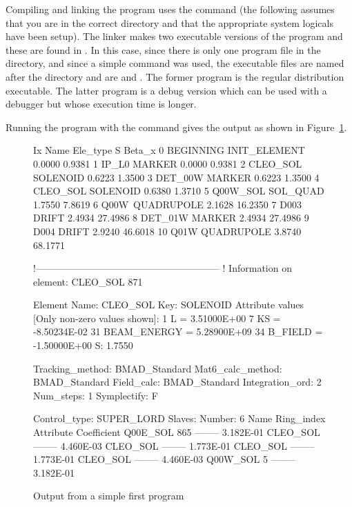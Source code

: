 Compiling and linking the program uses the  command (the
following assumes that you are in the correct directory and that the
appropriate system logicals have been setup). The linker makes two
executable versions of the program and these are found in .
In this case, since there is only one program file in the directory, and
since a simple  command was used, the executable files are
named after the directory and are  and
. The former program is the regular 
distribution executable. The latter program is a debug version
which can be used with a debugger but whose execution time is longer.

Running the program with the command 
gives the output as shown in Figure~\ref{f:output}.

\begin{figure}
\begin{listing}{1}
  Ix  Name              Ele_type                   S      Beta_x
   0  BEGINNING         INIT_ELEMENT          0.0000      0.9381
   1  IP_L0             MARKER                0.0000      0.9381
   2  CLEO_SOL\3        SOLENOID              0.6223      1.3500
   3  DET_00W           MARKER                0.6223      1.3500
   4  CLEO_SOL\4        SOLENOID              0.6380      1.3710
   5  Q00W\CLEO_SOL     SOL_QUAD              1.7550      7.8619
   6  Q00W\             QUADRUPOLE            2.1628     16.2350
   7  D003              DRIFT                 2.4934     27.4986
   8  DET_01W           MARKER                2.4934     27.4986
   9  D004              DRIFT                 2.9240     46.6018
  10  Q01W              QUADRUPOLE            3.8740     68.1771

 !---------------------------------------------------------
 ! Information on element: CLEO_SOL 871

  Element Name: CLEO_SOL
  Key: SOLENOID
  Attribute values [Only non-zero values shown]:
      1   L                =  3.51000E+00
      7   KS               = -8.50234E-02
     31   BEAM_ENERGY      =  5.28900E+09
     34   B_FIELD          = -1.50000E+00
  S:       1.7550

  Tracking_method:  BMAD_Standard
  Mat6_calc_method: BMAD_Standard
  Field_calc:       BMAD_Standard
  Integration_ord:    2
  Num_steps:          1
  Symplectify:        F

  Control_type: SUPER_LORD
  Slaves: Number:   6
      Name            Ring_index  Attribute       Coefficient
      Q00E\CLEO_SOL          865  --------          3.182E-01
      CLEO_SOL  --------          4.460E-03
      CLEO_SOL  --------          1.773E-01
      CLEO_SOL  --------          1.773E-01
      CLEO_SOL  --------          4.460E-03
      Q00W\CLEO_SOL            5  --------          3.182E-01
\end{listing}
\caption{Output from a simple first program}
\label{f:output}
\end{figure}

